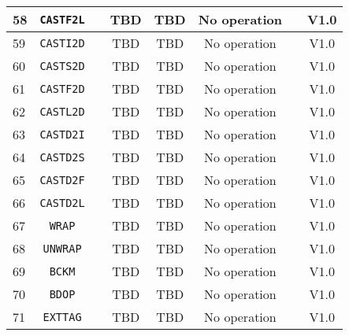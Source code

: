 \documentclass{article}
\begin{document}
\begin{longtable}{|l|c|c|c|c|c|c|c|}
		58 & \texttt{CASTF2L} & & TBD & TBD & No operation & & \textsf{V1.0} \\ \hline
		59 & \texttt{CASTI2D} & & TBD & TBD & No operation & & \textsf{V1.0} \\ \hline
		60 & \texttt{CASTS2D} & & TBD & TBD & No operation & & \textsf{V1.0} \\ \hline
		61 & \texttt{CASTF2D} & & TBD & TBD & No operation & & \textsf{V1.0} \\ \hline
		62 & \texttt{CASTL2D} & & TBD & TBD & No operation & & \textsf{V1.0} \\ \hline
		63 & \texttt{CASTD2I} & & TBD & TBD & No operation & & \textsf{V1.0} \\ \hline
		64 & \texttt{CASTD2S} & & TBD & TBD & No operation & & \textsf{V1.0} \\ \hline
		65 & \texttt{CASTD2F} & & TBD & TBD & No operation & & \textsf{V1.0} \\ \hline
		66 & \texttt{CASTD2L} & & TBD & TBD & No operation & & \textsf{V1.0} \\ \hline
		67 & \texttt{WRAP} & & TBD & TBD & No operation & & \textsf{V1.0} \\ \hline
		68 & \texttt{UNWRAP} & & TBD & TBD & No operation & & \textsf{V1.0} \\ \hline
		69 & \texttt{BCKM} & & TBD & TBD & No operation & & \textsf{V1.0} \\ \hline
		70 & \texttt{BDOP} & & TBD & TBD & No operation & & \textsf{V1.0} \\ \hline
		71 & \texttt{EXTTAG} & & TBD & TBD & No operation & & \textsf{V1.0} \\ \hline

\end{longtable}
\end{document}
